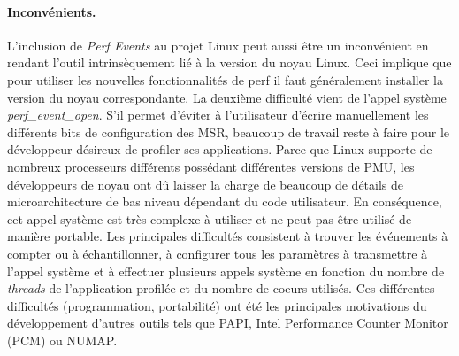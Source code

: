             \paragraph{Inconvénients.} L'inclusion de \textit{Perf Events} au projet Linux peut aussi être un inconvénient en rendant l'outil intrinsèquement lié à la version du noyau Linux. Ceci implique que pour utiliser les nouvelles fonctionnalités de perf il faut généralement installer la version du noyau correspondante. La deuxième difficulté vient de l'appel système \textit{perf\_event\_open}. S'il permet d'éviter à l'utilisateur d'écrire manuellement les différents bits de configuration des MSR, beaucoup de travail reste à faire pour le développeur désireux de profiler ses applications. Parce que Linux supporte de nombreux processeurs différents possédant différentes versions de PMU, les développeurs de noyau ont dû laisser la charge de beaucoup de détails de microarchitecture de bas niveau dépendant du code utilisateur. En conséquence, cet appel système est très complexe à utiliser et ne peut pas être utilisé de manière portable. Les principales difficultés consistent à trouver les événements à compter ou à échantillonner, à configurer tous les paramètres à transmettre à l'appel système et à effectuer plusieurs appels système en fonction du nombre de \textit{threads} de l'application profilée et du nombre de coeurs utilisés. Ces différentes difficultés (programmation, portabilité) ont été les principales motivations du développement d'autres outils tels que PAPI, Intel Performance Counter Monitor (PCM) ou NUMAP\cite{Selva2017}.


